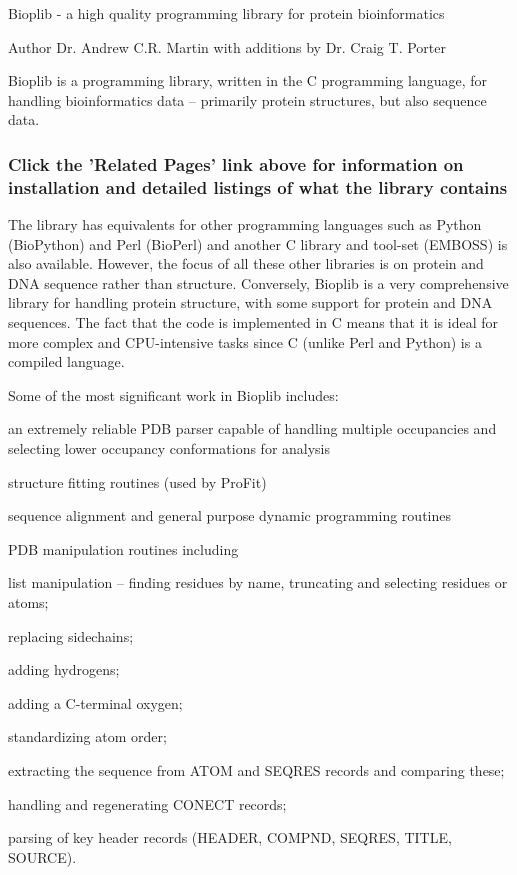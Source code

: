 Bioplib -\/ a high quality programming library for protein bioinformatics \begin{DoxyAuthor}{Author}
Dr. Andrew C.\-R. Martin with additions by Dr. Craig T. Porter
\end{DoxyAuthor}
Bioplib is a programming library, written in the C programming language, for handling bioinformatics data – primarily protein structures, but also sequence data.

\subsubsection*{Click the 'Related Pages' link above for information on installation and detailed listings of what the library contains}

The library has equivalents for other programming languages such as Python (Bio\-Python) and Perl (Bio\-Perl) and another C library and tool-\/set (E\-M\-B\-O\-S\-S) is also available. However, the focus of all these other libraries is on protein and D\-N\-A sequence rather than structure. Conversely, Bioplib is a very comprehensive library for handling protein structure, with some support for protein and D\-N\-A sequences. The fact that the code is implemented in C means that it is ideal for more complex and C\-P\-U-\/intensive tasks since C (unlike Perl and Python) is a compiled language.

Some of the most significant work in Bioplib includes\-:
\begin{DoxyItemize}
\item an extremely reliable P\-D\-B parser capable of handling multiple occupancies and selecting lower occupancy conformations for analysis
\item structure fitting routines (used by Pro\-Fit)
\item sequence alignment and general purpose dynamic programming routines
\item P\-D\-B manipulation routines including
\begin{DoxyItemize}
\item list manipulation – finding residues by name, truncating and selecting residues or atoms;
\item replacing sidechains;
\item adding hydrogens;
\item adding a C-\/terminal oxygen;
\item standardizing atom order;
\item extracting the sequence from A\-T\-O\-M and S\-E\-Q\-R\-E\-S records and comparing these;
\item handling and regenerating C\-O\-N\-E\-C\-T records;
\item parsing of key header records (H\-E\-A\-D\-E\-R, C\-O\-M\-P\-N\-D, S\-E\-Q\-R\-E\-S, T\-I\-T\-L\-E, S\-O\-U\-R\-C\-E).
\end{DoxyItemize}
\end{DoxyItemize}


